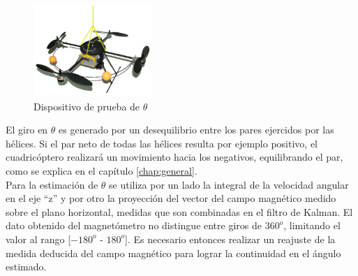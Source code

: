 \documentclass[main]{subfiles}
\begin{document}
\begin{figure}
	\vspace{-20pt}
	\centering
	\includegraphics[width=0.4\textwidth]{./pics_test_control/dispositivo_theta.pdf}
	\caption{Dispositivo de prueba de $\theta$}
	\label{fig:thetadisp}
\end{figure}

El giro en $\theta$ es generado por un desequilibrio entre los pares ejercidos por las h\'elices. Si el par neto de todas las h\'elices resulta por ejemplo positivo, el cuadric\'optero realizar\'a un movimiento hacia los negativos, equilibrando el par, como se explica en el cap\'itulo \ref{chap:general}.\\

Para la estimaci\'on de $\theta$ se utiliza por un lado la integral de la velocidad angular en el eje ``z'' y por otro la proyecci\'on del vector del campo magn\'etico medido sobre el plano horizontal, medidas que son combinadas en el filtro de Kalman. El dato obtenido del magnet\'ometro no distingue entre giros de $360^o$, limitando el valor al rango [$-180^o$ - $180^o$]. Es necesario entonces realizar un reajuste de la medida deducida del campo magn\'etico para lograr la continuidad en el \'angulo estimado.\\
\end{document}

